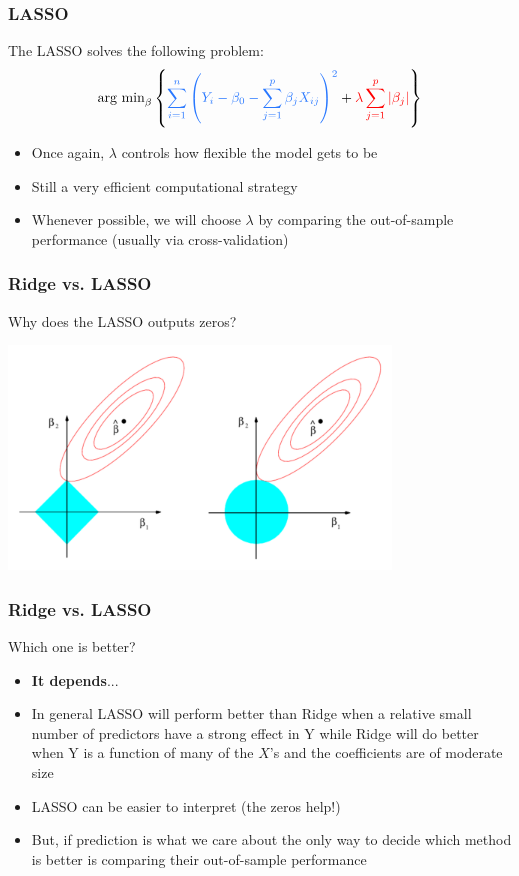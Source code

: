\documentclass{beamer}
\newcommand{\bo}[1]{\textcolor{burntorange}{#1}}
\newcommand{\bi}{\begin{itemize}}
\newcommand{\ib}{\end{itemize}}
\newcommand{\sk}{\vspace{.5cm}}
\begin{document}
\begin{frame}
\frametitle{LASSO}


The LASSO solves the following problem:
$$
\mbox{arg min}_{\beta} \left\{
{\color{lightblue}\sum_{i=1}^n \left( Y_i - \beta_0 -  \sum_{j=1}^p \beta_j X_{ij} \right)^2 }+ {\color{red}\lambda\sum_{j=1}^p |\beta_j|}  \right\}
$$
\bi
\item Once again, $\lambda$ controls how flexible the model gets to be
\item Still a very efficient computational strategy 
\item Whenever possible, we will choose $\lambda$ by comparing the out-of-sample performance (usually via cross-validation)
\ib 


\sk

\end{frame}
\begin{frame}
\frametitle{Ridge vs. LASSO}
Why does the LASSO outputs zeros?
\begin{center}
\includegraphics[width=4in]{6-7}
\end{center}

\end{frame}




\begin{frame}
\frametitle{Ridge vs. LASSO}
Which one is better? \sk
\bi
\item \bo{\bf It depends}... 
\item In general LASSO will perform better than Ridge when a relative small number of predictors have a strong effect in Y while Ridge will do better when Y is a function of many of the $X$'s and the coefficients are of moderate size
\item LASSO can be easier to interpret (the zeros help!)
\item But, if prediction is what we care about the only way to decide which method is better is comparing their out-of-sample performance
\ib

\end{frame}
\end{document}
